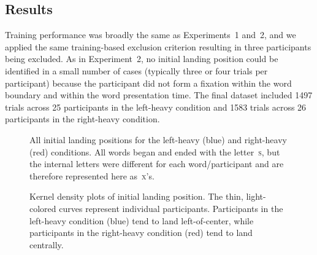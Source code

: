\documentclass[doc,biblatex]{apa7}
\begin{document}
\subsection{Results}

Training performance was broadly the same as Experiments~1 and~2, and we applied the same training-based exclusion criterion resulting in three participants being excluded. As in Experiment~2, no initial landing position could be identified in a small number of cases (typically three or four trials per participant) because the participant did not form a fixation within the word boundary and within the word presentation time. The final dataset included 1497 trials across 25 participants in the left-heavy condition and 1583 trials across 26 participants in the right-heavy condition.

\begin{figure}
\vspace*{2pt}
\caption{All initial landing positions for the left-heavy (blue) and right-heavy (red) conditions. All words began and ended with the letter~\textsc{s}, but the internal letters were different for each word/participant and are therefore represented here as~\textsc{x}'s.}
\label{fig13}
\end{figure}

\begin{figure}
\vspace*{2pt}
\caption{Kernel density plots of initial landing position. The thin, light-colored curves represent individual participants. Participants in the left-heavy condition (blue) tend to land left-of-center, while participants in the right-heavy condition (red) tend to land centrally.}
\label{fig14}
\end{figure}
\end{document}
